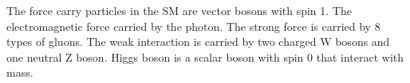 The force carry particles in the SM are vector bosons with spin 1. The electromagnetic force carried by the photon. The strong force is carried by 8 types of gluons. The weak interaction is carried by two charged W bosons and one neutral Z boson. Higgs boson is a scalar boson with spin 0 that interact with mass.


